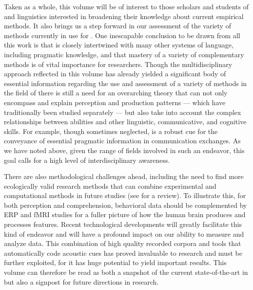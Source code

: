\documentclass[output=paper]{langsci/langscibook}
\begin{document}
\newpage 

Taken as a whole, this volume will be of interest to those scholars and students of  and linguistics interested in broadening their knowledge about current empirical methods. It also brings us a step forward in our assessment of the variety of methods currently in use for . One inescapable conclusion to be drawn from all this work is that  is closely intertwined with many other systems of language, including pragmatic knowledge, and that mastery of a variety of complementary methods is of vital importance for  researchers. Though the multidisciplinary approach reflected in this volume has already yielded a significant body of essential information regarding the use and assessment of a variety of methods in the field of  there is still a need for an overarching theory that can not only encompass and explain perception and production patterns — which have traditionally been studied separately — but also take into account the complex relationships between  abilities and other linguistic, communicative, and cognitive skills. For example, though sometimes neglected,  is a robust cue for the conveyance of essential pragmatic information in communication exchanges. As we have noted above, given the range of fields involved in such an endeavor, this goal calls for a high level of interdisciplinary awareness. 

There are also methodological challenges ahead, including the need to find more ecologically valid research methods that can combine experimental and computational methods in future studies (see \citealt{Prieto.2012} for a review). To illustrate this, for both perception and comprehension, behavioral data should be complemented by ERP and fMRI studies for a fuller picture of how the human brain produces and processes  features. Recent technological developments will greatly facilitate this kind of endeavor and will have a profound impact on our ability to measure and analyze  data. This combination of high quality recorded corpora and tools that automatically code acoustic cues has proved invaluable to research and must be further exploited, for it has huge potential to yield important results. This volume can therefore be read as both a snapshot of the current state-of-the-art in  but also a signpost for future directions in  research.


{\sloppy
\printbibliography[heading=subbibliography,notkeyword=this]
}
\end{document}
